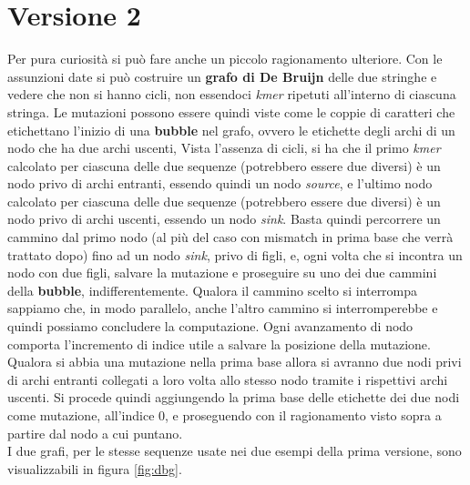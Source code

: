 \documentclass[a4paper,12pt, oneside]{book}
\begin{document}
\section{Versione 2}
Per pura curiosità si può fare anche un piccolo ragionamento ulteriore. Con le
assunzioni date si può costruire un \textbf{grafo di De Bruijn} delle due
stringhe e vedere che non si hanno cicli, non essendoci \textit{kmer} ripetuti
all'interno di ciascuna stringa. Le mutazioni possono essere quindi 
viste come le coppie di caratteri 
che etichettano l'inizio di una \textbf{bubble} nel grafo, ovvero le etichette
degli archi di un nodo che ha due archi uscenti, Vista l'assenza di
cicli, si ha che il primo \textit{kmer} calcolato per ciascuna delle due
sequenze (potrebbero essere due diversi) è un nodo privo di archi entranti,
essendo quindi un nodo \textit{source}, e
l'ultimo nodo calcolato per ciascuna delle due
sequenze (potrebbero essere due diversi) è un nodo privo di archi uscenti,
essendo un nodo \textit{sink}. Basta quindi percorrere un cammino dal primo nodo
(al più del caso con mismatch in prima base che verrà trattato dopo) fino ad un
nodo \textit{sink}, privo di figli, e, ogni volta che si incontra un nodo con due
figli, salvare la mutazione e proseguire su uno dei due cammini della
\textbf{bubble}, indifferentemente. Qualora il cammino scelto si interrompa
sappiamo che, in modo parallelo, anche l'altro cammino si interromperebbe e
quindi possiamo concludere la computazione. Ogni avanzamento di nodo comporta 
l'incremento di indice utile a salvare la posizione della mutazione.\\
Qualora si abbia una mutazione nella prima base allora si avranno due
nodi privi di archi entranti collegati a loro volta allo stesso nodo tramite i
rispettivi archi uscenti. Si procede
quindi aggiungendo la prima base delle etichette dei due nodi come mutazione,
all'indice 0, e proseguendo con il
ragionamento visto sopra a partire dal nodo a cui puntano.\\
I due grafi, per le stesse sequenze usate nei due esempi della prima versione,
sono visualizzabili in figura \ref{fig:dbg}.\\ 
\end{document}
